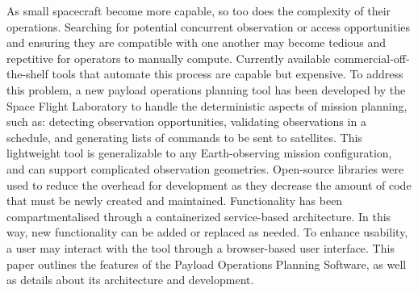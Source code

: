 \doublespacing 

As small spacecraft become more capable, so too does the complexity of their
operations. Searching for potential concurrent observation or access
opportunities and ensuring they are compatible with one another may become
tedious and repetitive for operators to manually compute. Currently available
commercial-off-the-shelf tools that automate this process are capable but
expensive. To address this problem, a new payload operations planning tool has
been developed by the Space Flight Laboratory to handle the deterministic
aspects of mission planning, such as: detecting observation opportunities,
validating observations in a schedule, and generating lists of commands to be
sent to satellites. This lightweight tool is generalizable to any
Earth-observing mission configuration, and can support complicated observation
geometries. Open-source libraries were used to reduce the overhead for
development as they decrease the amount of code that must be newly created and
maintained. Functionality has been compartmentalised through a containerized
service-based architecture. In this way, new functionality can be added or
replaced as needed. To enhance usability, a user may interact with the tool
through a browser-based user interface. This paper outlines the features of the
Payload Operations Planning Software, as well as details about its architecture
and development.

\doublespacing
